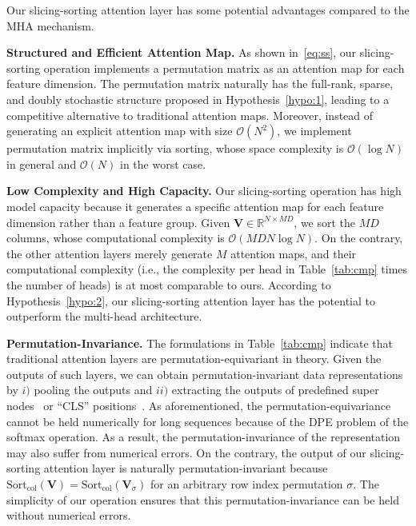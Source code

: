 Our slicing-sorting attention layer has some potential advantages compared to the MHA mechanism. 

\textbf{Structured and Efficient Attention Map.}
As shown in~\eqref{eq:ss}, our slicing-sorting operation implements a permutation matrix as an attention map for each feature dimension.
The permutation matrix naturally has the full-rank, sparse, and doubly stochastic structure proposed in Hypothesis~\ref{hypo:1}, leading to a competitive alternative to traditional attention maps.
Moreover, instead of generating an explicit attention map with size $\mathcal{O}(N^2)$, we implement permutation matrix implicitly via sorting, whose space complexity is $\mathcal{O}(\log N)$ in general and $\mathcal{O}(N)$ in the worst case. 

\textbf{Low Complexity and High Capacity.}
Our slicing-sorting operation has high model capacity because it generates a specific attention map for each feature dimension rather than a feature group. 
Given $\bm{V}\in\mathbb{R}^{N\times MD}$, we sort the $MD$ columns, whose computational complexity is $\mathcal{O}(MDN\log N)$. 
On the contrary, the other attention layers merely generate $M$ attention maps, and their computational complexity (i.e., the complexity per head in Table~\ref{tab:cmp} times the number of heads) is at most comparable to ours. 
According to Hypothesis~\ref{hypo:2}, our slicing-sorting attention layer has the potential to outperform the multi-head architecture. 


\textbf{Permutation-Invariance.}
The formulations in Table~\ref{tab:cmp} indicate that traditional attention layers are permutation-equivariant in theory. 
Given the outputs of such layers, we can obtain permutation-invariant data representations by $i)$ pooling the outputs and $ii)$ extracting the outputs of predefined super nodes~\cite{ying2021transformers} or ``CLS'' positions~\cite{vaswani2017attention,dosovitskiy2021an}.
As aforementioned, the permutation-equivariance cannot be held numerically for long sequences because of the DPE problem of the softmax operation. 
As a result, the permutation-invariance of the representation may also suffer from numerical errors. 
On the contrary, the output of our slicing-sorting attention layer is naturally permutation-invariant because $\text{Sort}_{\text{col}}(\bm{V})=\text{Sort}_{\text{col}}(\bm{V}_{\sigma})$ for an arbitrary row index permutation $\sigma$.
The simplicity of our operation ensures that this permutation-invariance can be held without numerical errors. 


